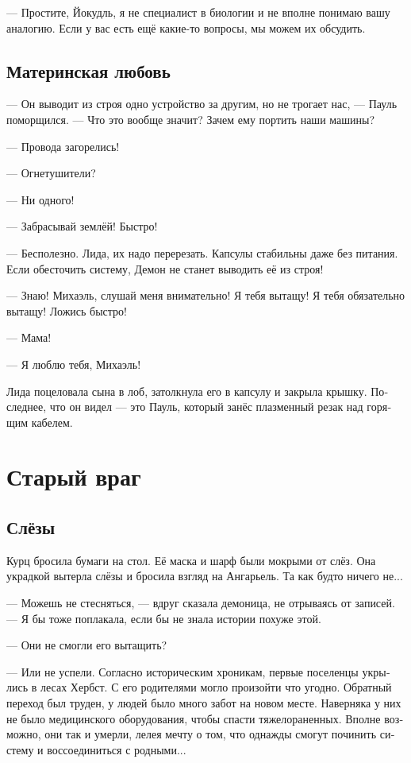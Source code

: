 \documentclass[a4paper,12pt,fleqn]{book}\usepackage{polyglossia}\setdefaultlanguage[babelshorthands=true]{russian}\setotherlanguage{english}\defaultfontfeatures{Ligatures=TeX,Mapping=tex-text}\usepackage{xcolor}\newcommand{\ml}[3]{#2}
\newcommand{\asterism}{\vspace{1em}{\centering\Large\bfseries$\ast~\ast~\ast$\par}\vspace{1em}}
\begin{document}
\ml{$0$}
{--- Простите, Йокудль, я не специалист в биологии и не вполне понимаю вашу аналогию.}
{``I'm sorry, Jökull, I'm not an expert in biology, so I'm not sure I properly understand your analogy.}
Если у вас есть ещё какие-то вопросы, мы можем их обсудить.

\section{Материнская любовь}

--- Он выводит из строя одно устройство за другим, но не трогает нас, --- Пауль поморщился.
--- Что это вообще значит?
Зачем ему портить наши машины?

\asterism

--- Провода загорелись!

--- Огнетушители?

--- Ни одного!

--- Забрасывай землёй!
Быстро!

--- Бесполезно.
Лида, их надо перерезать.
Капсулы стабильны даже без питания.
Если обесточить систему, Демон не станет выводить её из строя!

--- Знаю!
Михаэль, слушай меня внимательно!
Я тебя вытащу!
Я тебя обязательно вытащу!
Ложись быстро!

--- Мама!

--- Я люблю тебя, Михаэль!

Лида поцеловала сына в лоб, затолкнула его в капсулу и закрыла крышку.
Последнее, что он видел --- это Пауль, который занёс плазменный резак над горящим кабелем.

\chapter{Старый враг}

\section{Слёзы}

Курц бросила бумаги на стол.
Её маска и шарф были мокрыми от слёз.
Она украдкой вытерла слёзы и бросила взгляд на Ангарьель.
Та как будто ничего не...

--- Можешь не стесняться, --- вдруг сказала демоница, не отрываясь от записей.
--- Я бы тоже поплакала, если бы не знала истории похуже этой.

--- Они не смогли его вытащить?

--- Или не успели.
Согласно историческим хроникам, первые поселенцы укрылись в лесах Хербст.
С его родителями могло произойти что угодно.
Обратный переход был труден, у людей было много забот на новом месте.
Наверняка у них не было медицинского оборудования, чтобы спасти тяжелораненных.
Вполне возможно, они так и умерли, лелея мечту о том, что однажды смогут починить систему и воссоединиться с родными...
\end{document}
